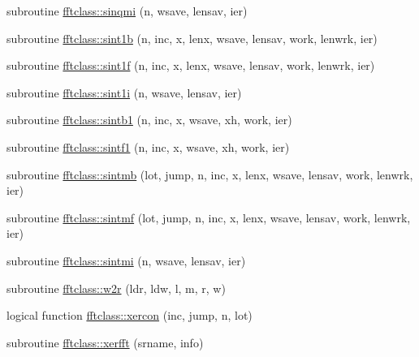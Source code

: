 \begin{DoxyCompactItemize}
\item 
subroutine \mbox{\hyperlink{namespacefftclass_a642a9e3f241f3aaa6baf58741d4cdd3b}{fftclass\+::sinqmi}} (n, wsave, lensav, ier)
\item 
subroutine \mbox{\hyperlink{namespacefftclass_ada18e37204cdb55b83be98eaecc27730}{fftclass\+::sint1b}} (n, inc, x, lenx, wsave, lensav, work, lenwrk, ier)
\item 
subroutine \mbox{\hyperlink{namespacefftclass_a6ae22ff215b2e962b410eb1b9c4860d7}{fftclass\+::sint1f}} (n, inc, x, lenx, wsave, lensav, work, lenwrk, ier)
\item 
subroutine \mbox{\hyperlink{namespacefftclass_ae156ccdcf953af967a42d20df0ddb725}{fftclass\+::sint1i}} (n, wsave, lensav, ier)
\item 
subroutine \mbox{\hyperlink{namespacefftclass_af29f41f086c8e8901df2716d0b86db20}{fftclass\+::sintb1}} (n, inc, x, wsave, xh, work, ier)
\item 
subroutine \mbox{\hyperlink{namespacefftclass_aa79de4b10a068408990ac9ac8f32d134}{fftclass\+::sintf1}} (n, inc, x, wsave, xh, work, ier)
\item 
subroutine \mbox{\hyperlink{namespacefftclass_a4d9b6f96810b5b7a8b7dd38af74f5b55}{fftclass\+::sintmb}} (lot, jump, n, inc, x, lenx, wsave, lensav, work, lenwrk, ier)
\item 
subroutine \mbox{\hyperlink{namespacefftclass_a497c6a39bac7daa7973b53cb00ffd6c3}{fftclass\+::sintmf}} (lot, jump, n, inc, x, lenx, wsave, lensav, work, lenwrk, ier)
\item 
subroutine \mbox{\hyperlink{namespacefftclass_a9b28ecda04690fe2a4425da2b5625e4d}{fftclass\+::sintmi}} (n, wsave, lensav, ier)
\item 
subroutine \mbox{\hyperlink{namespacefftclass_af191171f5e31fbad6c0e224faaf6175e}{fftclass\+::w2r}} (ldr, ldw, l, m, r, w)
\item 
logical function \mbox{\hyperlink{namespacefftclass_a16b89da06cf17773f6b5aec6883952c2}{fftclass\+::xercon}} (inc, jump, n, lot)
\item 
subroutine \mbox{\hyperlink{namespacefftclass_a3e1884f0fa20142f45f2d3efe3246adc}{fftclass\+::xerfft}} (srname, info)
\end{DoxyCompactItemize}
